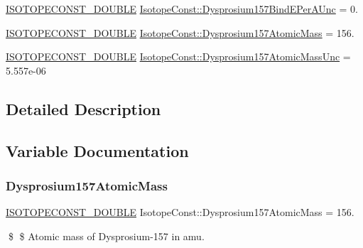 \begin{DoxyCompactItemize}
\item 
\mbox{\hyperlink{group___isotope_const-_macros_ga8f45a7272ce02c0b4c65c44636ed719a}{I\+S\+O\+T\+O\+P\+E\+C\+O\+N\+S\+T\+\_\+\+D\+O\+U\+B\+LE}} \mbox{\hyperlink{group___isotope_const-_dysprosium-_dy157_gaeeb06984f6325d629b0881b5f988d85c}{Isotope\+Const\+::\+Dysprosium157\+Bind\+E\+Per\+A\+Unc}} = 0.
\item 
\mbox{\hyperlink{group___isotope_const-_macros_ga8f45a7272ce02c0b4c65c44636ed719a}{I\+S\+O\+T\+O\+P\+E\+C\+O\+N\+S\+T\+\_\+\+D\+O\+U\+B\+LE}} \mbox{\hyperlink{group___isotope_const-_dysprosium-_dy157_gab455e7a8b5b28464a2fe7ff7664dad24}{Isotope\+Const\+::\+Dysprosium157\+Atomic\+Mass}} = 156.
\item 
\mbox{\hyperlink{group___isotope_const-_macros_ga8f45a7272ce02c0b4c65c44636ed719a}{I\+S\+O\+T\+O\+P\+E\+C\+O\+N\+S\+T\+\_\+\+D\+O\+U\+B\+LE}} \mbox{\hyperlink{group___isotope_const-_dysprosium-_dy157_ga48b75062e9694324126457c78c7895da}{Isotope\+Const\+::\+Dysprosium157\+Atomic\+Mass\+Unc}} = 5.\+557e-\/06
\end{DoxyCompactItemize}


\subsection{Detailed Description}


\subsection{Variable Documentation}
\mbox{\label{group___isotope_const-_dysprosium-_dy157_gab455e7a8b5b28464a2fe7ff7664dad24}} 
\subsubsection{\texorpdfstring{Dysprosium157\+Atomic\+Mass}{Dysprosium157AtomicMass}}
{\footnotesize\ttfamily \mbox{\hyperlink{group___isotope_const-_macros_ga8f45a7272ce02c0b4c65c44636ed719a}{I\+S\+O\+T\+O\+P\+E\+C\+O\+N\+S\+T\+\_\+\+D\+O\+U\+B\+LE}} Isotope\+Const\+::\+Dysprosium157\+Atomic\+Mass = 156.}

\$ \$ Atomic mass of Dysprosium-\/157 in amu. \mbox{\label{group___isotope_const-_dysprosium-_dy157_ga48b75062e9694324126457c78c7895da}} 
